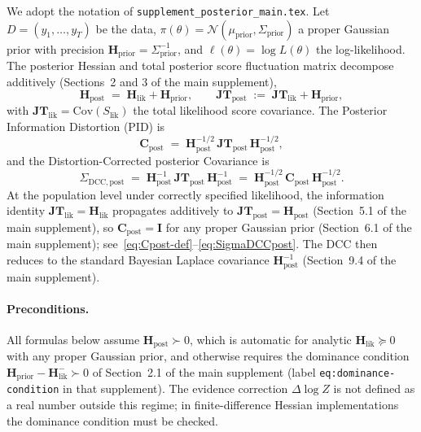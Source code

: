 \documentclass[11pt]{article}
\begin{document}
We adopt the notation of \texttt{supplement\_posterior\_main.tex}. Let $D = (y_1,\ldots,y_T)$
be the data, $\pi(\theta) = \mathcal{N}(\mu_{\mathrm{prior}}, \Sigma_{\mathrm{prior}})$ a
proper Gaussian prior with precision $\mathbf H_{\mathrm{prior}} = \Sigma_{\mathrm{prior}}^{-1}$,
and $\ell(\theta) = \log L(\theta)$ the log-likelihood. The posterior Hessian and total
posterior score fluctuation matrix decompose additively (Sections~2 and 3 of the main
supplement),
\begin{equation}
\mathbf H_{\mathrm{post}} \;=\; \mathbf H_{\mathrm{lik}} + \mathbf H_{\mathrm{prior}},
\qquad
\mathbf{JT}_{\mathrm{post}} \;:=\; \mathbf{JT}_{\mathrm{lik}} + \mathbf H_{\mathrm{prior}},
\label{eq:setup-decomp}
\end{equation}
with $\mathbf{JT}_{\mathrm{lik}} = \mathrm{Cov}(S_{\mathrm{lik}})$ the total likelihood
score covariance. The Posterior Information Distortion (PID) is
\begin{equation}
\mathbf C_{\mathrm{post}}
\;=\;
\mathbf H_{\mathrm{post}}^{-1/2}\,
\mathbf{JT}_{\mathrm{post}}\,
\mathbf H_{\mathrm{post}}^{-1/2},
\label{eq:Cpost-def}
\end{equation}
and the Distortion-Corrected posterior Covariance is
\begin{equation}
\Sigma_{\mathrm{DCC},\mathrm{post}}
\;=\;
\mathbf H_{\mathrm{post}}^{-1}\,
\mathbf{JT}_{\mathrm{post}}\,
\mathbf H_{\mathrm{post}}^{-1}
\;=\;
\mathbf H_{\mathrm{post}}^{-1/2}\,
\mathbf C_{\mathrm{post}}\,
\mathbf H_{\mathrm{post}}^{-1/2}.
\label{eq:SigmaDCCpost}
\end{equation}
At the population level under correctly specified likelihood, the information identity
$\mathbf{JT}_{\mathrm{lik}} = \mathbf H_{\mathrm{lik}}$ propagates additively to
$\mathbf{JT}_{\mathrm{post}} = \mathbf H_{\mathrm{post}}$ (Section~5.1 of the main
supplement), so $\mathbf C_{\mathrm{post}} = \mathbf I$ for any proper Gaussian
prior (Section~6.1 of the main supplement); see~\eqref{eq:Cpost-def}--\eqref{eq:SigmaDCCpost}.
The DCC then reduces to the standard Bayesian Laplace covariance
$\mathbf H_{\mathrm{post}}^{-1}$ (Section~9.4 of the main supplement).

\paragraph{Preconditions.}
All formulas below assume $\mathbf H_{\mathrm{post}} \succ 0$, which is automatic for
analytic $\mathbf H_{\mathrm{lik}} \succeq 0$ with any proper Gaussian prior, and otherwise
requires the dominance condition $\mathbf H_{\mathrm{prior}} - \mathbf H_{\mathrm{lik}}^- \succ 0$
of Section~2.1 of the main supplement (label \texttt{eq:dominance-condition} in that
supplement). The evidence correction $\Delta\log Z$ is not defined as a real number outside
this regime; in finite-difference Hessian implementations the dominance condition must be
checked.
\end{document}
